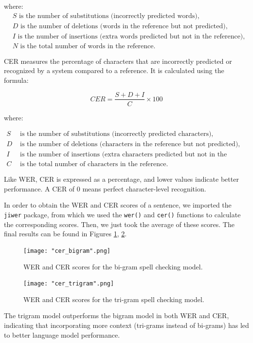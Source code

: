 \documentclass[11pt, a4paper]{article}
\begin{document}
    where:
    \begin{align*}
    & S \text{ is the number of substitutions (incorrectly predicted words)}, \\
    & D \text{ is the number of deletions (words in the reference but not predicted)}, \\
    & I \text{ is the number of insertions (extra words predicted but not in the reference)}, \\
    & N \text{ is the total number of words in the reference}.
    \end{align*}

    CER measures the percentage of characters that are incorrectly predicted or recognized by a system compared to a reference. It is calculated using the formula:

    \[ CER = \frac{S + D + I}{C} \times 100 \]

    where:

    \begin{align*}
    S & \text{ is the number of substitutions (incorrectly predicted characters),} \\
    D & \text{ is the number of deletions (characters in the reference but not predicted),} \\
    I & \text{ is the number of insertions (extra characters predicted but not in the reference),} \\
    C & \text{ is the total number of characters in the reference.}
    \end{align*}

    Like WER, CER is expressed as a percentage, and lower values indicate better performance. A CER of 0 means perfect character-level recognition.

    
	In order to obtain the WER and CER scores of a sentence, we imported the \texttt{jiwer} package, from which we used the \texttt{wer()} and \texttt{cer()} functions to calculate the corresponding scores. Then, we just took the average of these scores. The final results can be found in Figures \ref{fig::cer_bigram}, \ref{fig::cer_trigram}.
	

     

	
	 \begin{figure}
	    \centering
	    \texttt{[image: "cer\_bigram".png]}
	    \caption{WER and CER scores for the bi-gram spell checking model.}
	    \label{fig::cer_bigram}
	\end{figure}
	
	
	 \begin{figure}
	    \centering
	    \texttt{[image: "cer\_trigram".png]}
	    \caption{WER and CER scores for the tri-gram spell checking model.}
	    \label{fig::cer_trigram}
	\end{figure}
 
	The trigram model outperforms the bigram model in both WER and CER, indicating that incorporating more context (tri-grams instead of bi-grams) has led to better language model performance.
	
\end{document}
